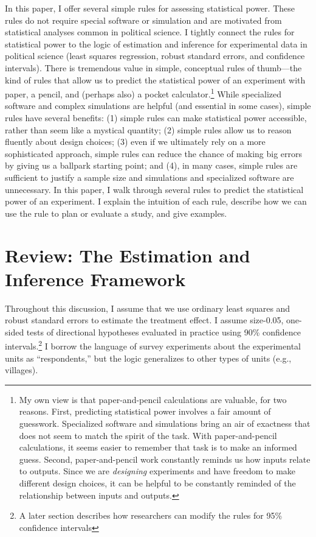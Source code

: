 \documentclass[12pt]{article}
\begin{document}
In this paper, I offer several simple rules for assessing statistical power. 
These rules do not require special software or simulation and are motivated from statistical analyses common in political science. 
I tightly connect the rules for statistical power to the logic of estimation and inference for experimental data in political science (least squares regression, robust standard errors, and confidence intervals).
There is tremendous value in simple, conceptual rules of thumb---the kind of rules that allow us to predict the statistical power of an experiment with paper, a pencil, and (perhaps also) a pocket calculator.\footnote{
  My own view is that paper-and-pencil calculations are valuable, for two reasons. 
  First, predicting statistical power involves a fair amount of guesswork. 
  Specialized software and simulations bring an air of exactness that does not seem to match the spirit of the task. 
  With paper-and-pencil calculations, it seems easier to remember that task is to make an informed guess. 
  Second, paper-and-pencil work constantly reminds us how inputs relate to outputs. 
  Since we are \emph{designing} experiments and have freedom to make different design choices, it can be helpful to be constantly reminded of the relationship between inputs and outputs.
  }
While specialized software and complex simulations are helpful (and essential in some cases), simple rules have several benefits: 
(1) simple rules can make statistical power accessible, rather than seem like a mystical quantity; 
(2) simple rules allow us to reason fluently about design choices; 
(3) even if we ultimately rely on a more sophisticated approach, simple rules can reduce the chance of making big errors by giving us a ballpark starting point; and
(4), in many cases, simple rules are sufficient to justify a sample size and simulations and specialized software are unnecessary. 
In this paper, I walk through several rules to predict the statistical power of an experiment. 
I explain the intuition of each rule, describe how we can use the rule to plan or evaluate a study, and give examples.

\section*{Review: The Estimation and Inference Framework}

Throughout this discussion, I assume that we use ordinary least squares and robust standard errors to estimate the treatment effect. 
I assume size-0.05, one-sided tests of directional hypotheses evaluated in practice using 90\% confidence intervals.\footnote{
  A later section describes how researchers can modify the rules for 95\% confidence intervals
}
I borrow the language of survey experiments about the experimental units as ``respondents,'' but the logic generalizes to other types of units (e.g., villages). 
\end{document}
